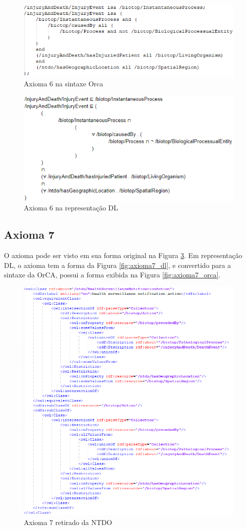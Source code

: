 \documentclass{bcc}
\begin{document}
\begin{figure}[H]
\centering
\includegraphics[width=.7\textwidth]{Figuras/axioma6_orca.png}
\caption{Axioma 6 na sintaxe Orca} 
\label{fig:axioma6_orca}
\end{figure}

\begin{figure}[H]
\centering
\includegraphics[width=.7\textwidth]{Figuras/axioma6_dl.png}
\caption{Axioma 6 na representação DL} 
\label{fig:axioma6_dl}
\end{figure}

\subsection{Axioma 7}
O axioma pode ser visto em sua forma original na Figura \ref{fig:axioma7_o}. Em representação DL, o axioma tem a forma da Figura \ref{fig:axioma7_dl}, e convertido para a sintaxe da OrCA, possui a forma exibida na Figura \ref{fig:axioma7_orca}. 

\begin{figure}[H]
\centering
\includegraphics[width=.9\textwidth]{Figuras/axioma7_o.png}
\caption{Axioma 7 retirado da NTDO} 
\label{fig:axioma7_o}
\end{figure}
\end{document}
